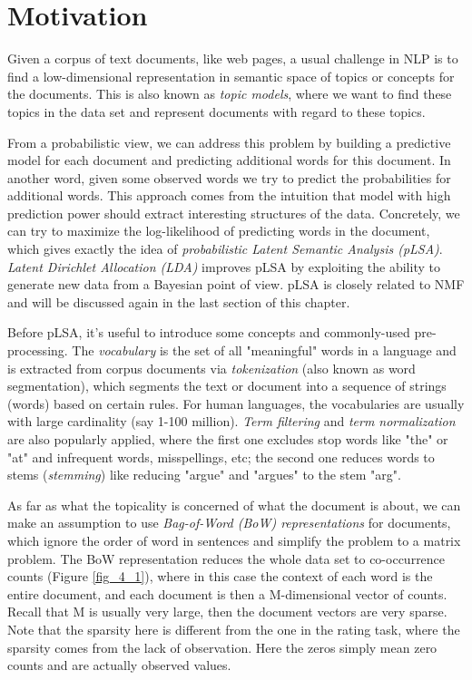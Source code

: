 \documentclass[../main.tex]{subfiles}
\begin{document}
\section{Motivation}
Given a corpus of text documents, like web pages, a usual challenge in NLP is to find a low-dimensional representation in semantic space of topics or concepts for the documents. This is also known as \emph{topic models}, where we want to find these topics in the data set and represent documents with regard to these topics. 
\par From a probabilistic view, we can address this problem by building a predictive model for each document and predicting additional words for this document. In another word, given some observed words we try to predict the probabilities for additional words. This approach comes from the intuition that model with high prediction power should extract interesting structures of the data. Concretely, we can try to maximize the log-likelihood of predicting words in the document, which gives exactly the idea of \emph{probabilistic Latent Semantic Analysis (pLSA)}. \emph{Latent Dirichlet Allocation (LDA)} improves pLSA by exploiting the ability to generate new data from a Bayesian point of view. pLSA is closely related to NMF and will be discussed again in the last section of this chapter.
\par Before pLSA, it's useful to introduce some concepts and commonly-used pre-processing. The \emph{vocabulary} is the set of all "meaningful" words in a language and is extracted from corpus documents via \emph{tokenization} (also known as word segmentation), which segments the text or document into a sequence of strings (words) based on certain rules. For human languages, the vocabularies are usually with large cardinality (say 1-100 million). \emph{Term filtering} and \emph{term normalization} are also popularly applied, where the first one excludes stop words like "the" or "at" and infrequent words, misspellings, etc; the second one reduces words to stems (\emph{stemming}) like reducing "argue" and "argues" to the stem "arg".
\par As far as what the topicality is concerned of what the document is about, we can make an assumption to use \emph{Bag-of-Word (BoW) representations} for documents, which ignore the order of word in sentences and simplify the problem to a matrix problem. The BoW representation reduces the whole data set to co-occurrence counts (Figure \ref{fig_4_1}), where in this case the context of each word is the entire document, and each document is then a M-dimensional vector of counts. Recall that M is usually very large, then the document vectors are very sparse. Note that the sparsity here is different from the one in the rating task, where the sparsity comes from the lack of observation. Here the zeros simply mean zero counts and are actually observed values.
\end{document}
